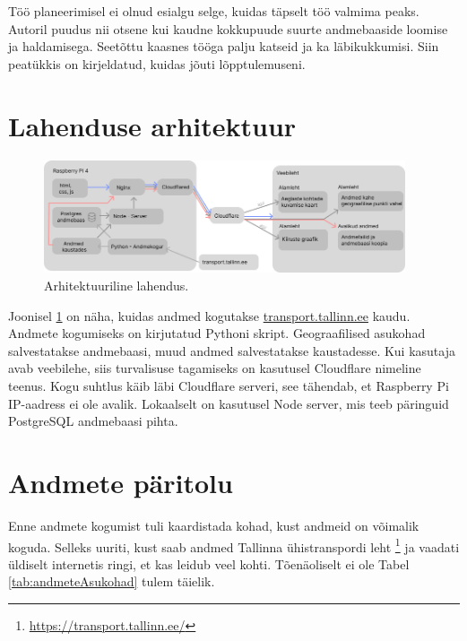 
Töö planeerimisel ei olnud esialgu selge, kuidas täpselt töö valmima peaks. Autoril puudus nii otsene kui kaudne kokkupuude suurte andmebaaside loomise ja haldamisega. Seetõttu kaasnes tööga palju katseid ja ka läbikukkumisi. Siin peatükkis on kirjeldatud, kuidas jõuti lõpptulemuseni.

\section{Lahenduse arhitektuur} %
\begin{figure}[h!]
    \centering
    \includegraphics[width=0.95\textwidth]{figures/struktuur.png}
    \caption{Arhitektuuriline lahendus.}
    \label{fig:Struktuur}
\end{figure}

Joonisel \ref{fig:Struktuur} on näha, kuidas andmed kogutakse \url{transport.tallinn.ee} kaudu. Andmete kogumiseks on kirjutatud Pythoni skript. Geograafilised asukohad salvestatakse andmebaasi, muud andmed salvestatakse kaustadesse. Kui kasutaja avab veebilehe, siis turvalisuse tagamiseks on kasutusel Cloudflare nimeline teenus. Kogu suhtlus käib läbi Cloudflare serveri, see tähendab, et Raspberry Pi  IP-aadress ei ole avalik. Lokaalselt on kasutusel Node server, mis teeb päringuid PostgreSQL andmebaasi pihta.

\section{Andmete päritolu}


Enne andmete kogumist tuli kaardistada kohad, kust andmeid on võimalik koguda. Selleks uuriti, kust saab andmed Tallinna ühistranspordi leht \footnote{\url{https://transport.tallinn.ee/}} ja vaadati üldiselt internetis ringi, et kas leidub veel kohti.
Tõenäoliselt ei ole Tabel \ref{tab:andmeteAsukohad} tulem täielik.

